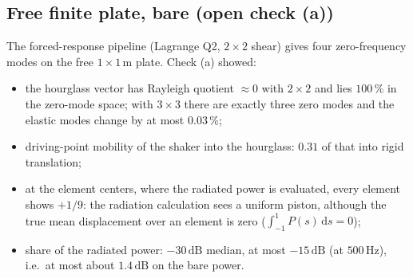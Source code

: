 \subsection{Free finite plate, bare (open check (a))}
The forced-response pipeline (Lagrange Q2, $2\times 2$ shear) gives four
zero-frequency modes on the free $1 \times 1\,\mathrm{m}$ plate. Check (a) showed:
\begin{itemize}
  \item the hourglass vector has Rayleigh quotient $\approx 0$ with $2\times 2$ and lies
        $100\,\%$ in the zero-mode space; with $3\times 3$ there are exactly three zero
        modes and the elastic modes change by at most $0.03\,\%$;
  \item driving-point mobility of the shaker into the hourglass: $0.31$ of that into
        rigid translation;
  \item at the element centers, where the radiated power is evaluated, every element
        shows $+1/9$: the radiation calculation sees a uniform piston, although the
        true mean displacement over an element is zero
        ($\int_{-1}^{1} P(s)\,\mathrm{d}s = 0$);
  \item share of the radiated power: $-30\,\mathrm{dB}$ median, at most
        $-15\,\mathrm{dB}$ (at $500\,\mathrm{Hz}$), i.e.\ at most about
        $1.4\,\mathrm{dB}$ on the bare power.
\end{itemize}

